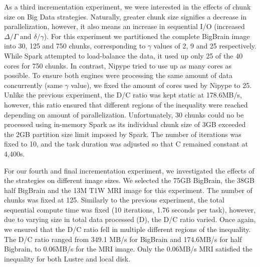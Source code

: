 \documentclass{IEEEtran}
\begin{document}
As a third incrementation experiment, we were interested in the effects of 
chunk size on Big Data strategies. Naturally, greater chunk size signifies 
a decrease in parallelization, however, it also means an increase in 
sequential I/O (increased $\Delta/\Gamma$ and $\delta/\gamma$). For 
this experiment we partitioned the complete BigBrain image into 30, 125 
and 750 chunks, corresponding to $\gamma$ values of 2, 9 and 25 
respectively. While Spark attempted to load-balance the data, it used 
up only 25 of the 40 cores for 750 chunks. In contrast, Nipype tried to 
use up as many cores as possible. To ensure both engines were 
processing the same amount of data concurrently (same $\gamma$ value), 
we fixed the amount of cores used by Nipype to 25. Unlike the previous 
experiment, the D/C ratio was kept static at 178.6MB/s, however, this 
ratio ensured that different regions of the inequality were reached 
depending on amount of parallelization. Unfortunately, 30 chunks could 
no be processed using in-memory Spark as its individual chunk size of 
3GB exceeded the 2GB partition size limit imposed by Spark. The number of iterations was
fixed to 10, and the task duration was adjusted so that C remained constant at 4,400s.

For our fourth and final incrementation experiment, we investigated the effects 
of the strategies on different image sizes. We selected the 75GB BigBrain, the
38GB half BigBrain and the 13M T1W MRI image for this experiment. The number of
chunks was fixed at 125. Similarly to the previous experiment, the 
total sequential compute time was fixed (10 iterations, 1.76 seconds 
per task), however, due to varying size in total data processed (D), 
the D/C ratio varied. Once again, we ensured that the D/C ratio fell in 
multiple different regions of the inequality. The D/C ratio ranged from 
349.1 MB/s for BigBrain and 174.6MB/s for half Bigbrain, to 0.06MB/s for the MRI 
image. Only the 0.06MB/s MRI satisfied the inequality for both Lustre and local 
disk.









\end{document}
